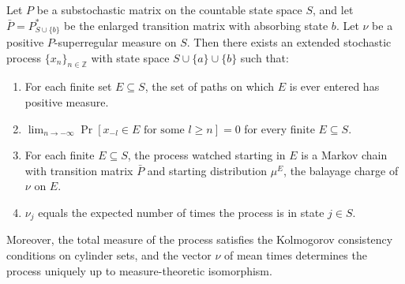 Let $P$ be a substochastic matrix on the countable state space $S$, and let $\bar{P} = P^*_{S \cup \{b\}}$ be the enlarged transition matrix with absorbing state $b$. Let $\nu$ be a positive $P$-superregular measure on $S$. Then there exists an extended stochastic process $\{x_n\}_{n \in \mathbb{Z}}$ with state space $S \cup \{a\} \cup \{b\}$ such that:

\begin{enumerate}
\item[(1)] For each finite set $E \subseteq S$, the set of paths on which $E$ is ever entered has positive measure.
\item[(2)] $\displaystyle\lim_{n \to -\infty} \Pr[x_{-l} \in E \text{ for some } l \geq n] = 0$ for every finite $E \subseteq S$.
\item[(3)] For each finite $E \subseteq S$, the process watched starting in $E$ is a Markov chain with transition matrix $\bar{P}$ and starting distribution $\mu^E$, the balayage charge of $\nu$ on $E$.
\item[(4)] $\nu_j$ equals the expected number of times the process is in state $j \in S$.
\end{enumerate}

Moreover, the total measure of the process satisfies the Kolmogorov consistency conditions on cylinder sets, and the vector $\nu$ of mean times determines the process uniquely up to measure-theoretic isomorphism.
